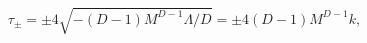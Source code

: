 \begin{equation}
    \label{tensions}
    \tau_\pm=\pm4\sqrt{-(D-1)M^{D-1}\Lambda /
      D}=\pm4(D-1)M^{D-1} k,
\end{equation}

